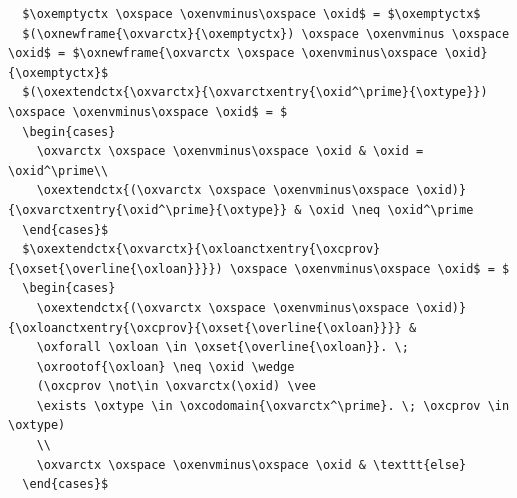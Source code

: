 \begin{lstlisting}
  $\oxemptyctx \oxspace \oxenvminus\oxspace \oxid$ = $\oxemptyctx$
  $(\oxnewframe{\oxvarctx}{\oxemptyctx}) \oxspace \oxenvminus \oxspace \oxid$ = $\oxnewframe{\oxvarctx \oxspace \oxenvminus\oxspace \oxid}{\oxemptyctx}$
  $(\oxextendctx{\oxvarctx}{\oxvarctxentry{\oxid^\prime}{\oxtype}}) \oxspace \oxenvminus\oxspace \oxid$ = $
  \begin{cases}
    \oxvarctx \oxspace \oxenvminus\oxspace \oxid & \oxid = \oxid^\prime\\
    \oxextendctx{(\oxvarctx \oxspace \oxenvminus\oxspace \oxid)}{\oxvarctxentry{\oxid^\prime}{\oxtype}} & \oxid \neq \oxid^\prime
  \end{cases}$
  $\oxextendctx{\oxvarctx}{\oxloanctxentry{\oxcprov}{\oxset{\overline{\oxloan}}}}) \oxspace \oxenvminus\oxspace \oxid$ = $
  \begin{cases}
    \oxextendctx{(\oxvarctx \oxspace \oxenvminus\oxspace \oxid)}{\oxloanctxentry{\oxcprov}{\oxset{\overline{\oxloan}}}} &
    \oxforall \oxloan \in \oxset{\overline{\oxloan}}. \;
    \oxrootof{\oxloan} \neq \oxid \wedge
    (\oxcprov \not\in \oxvarctx(\oxid) \vee
    \exists \oxtype \in \oxcodomain{\oxvarctx^\prime}. \; \oxcprov \in \oxtype)
    \\
    \oxvarctx \oxspace \oxenvminus\oxspace \oxid & \texttt{else}
  \end{cases}$
\end{lstlisting}